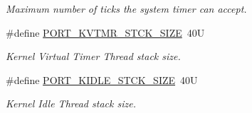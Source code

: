 \begin{DoxyCompactItemize}
\begin{DoxyCompactList}\small\item\em Maximum number of ticks the system timer can accept. \end{DoxyCompactList}\item 
\#define \hyperlink{group__template__cpu__intf_ga9f3862a2ded7b9fbb69f982acc020728}{P\-O\-R\-T\-\_\-\-K\-V\-T\-M\-R\-\_\-\-S\-T\-C\-K\-\_\-\-S\-I\-Z\-E}~40\-U
\begin{DoxyCompactList}\small\item\em Kernel Virtual Timer Thread stack size. \end{DoxyCompactList}\item 
\#define \hyperlink{group__template__cpu__intf_ga2cb7ea9e526744b74367bbffda625044}{P\-O\-R\-T\-\_\-\-K\-I\-D\-L\-E\-\_\-\-S\-T\-C\-K\-\_\-\-S\-I\-Z\-E}~40\-U
\begin{DoxyCompactList}\small\item\em Kernel Idle Thread stack size. \end{DoxyCompactList}\end{DoxyCompactItemize}
